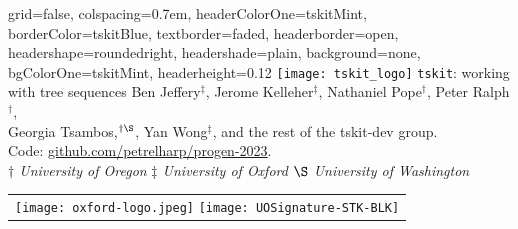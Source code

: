 \documentclass[landscape,a0paper,fontscale=0.5]{baposter}
\newcommand{\tskit}{{\texttt{tskit}}}
\begin{document}
\begin{poster}{
 grid=false,
 colspacing=0.7em,
 headerColorOne=tskitMint,
 borderColor=tskitBlue,
 textborder=faded,
 headerborder=open,
 headershape=roundedright,
 headershade=plain,
 background=none,
 bgColorOne=tskitMint,
 headerheight=0.12\textheight}
 { \texttt{[image: tskit\_logo]}
 }
 {\Huge \tskit{}: \sc working with tree sequences}
  {\sf %
    Ben Jeffery${}^\ddagger$,
    Jerome Kelleher$^{\ddagger}$,
    Nathaniel Pope${}^\dagger$,
    Peter Ralph${}^\dagger$,
    \\  \vspace{-1.0mm}
    Georgia Tsambos,${}^{\dagger\S}$,
    Yan Wong$^{\ddagger}$,
    and the rest of the tskit-dev group.
    \\  \vspace{-1.0mm}
    Code: \url{github.com/petrelharp/progen-2023}. 
    \\  \vspace{-1.0mm}
    {\small \textit{$\dagger$ University of Oregon} } %
    {\small \textit{$\ddagger$ University of Oxford} } %
    {\small \textit{$\S$ University of Washington}} \\
  }
 {
  \begin{tabular}{r}
    \texttt{[image: oxford-logo.jpeg]}
      \hspace{1em}
    \texttt{[image: UOSignature-STK-BLK]}\\
  \end{tabular}
 }



\end{poster}
\end{document}
